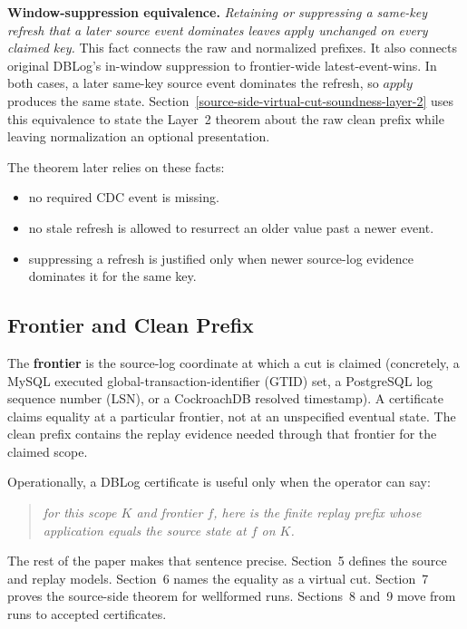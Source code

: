 \documentclass[letterpaper,10pt,twocolumn]{article}
\newcommand{\Apply}{\mathit{apply}}
\providecommand{\tightlist}{\setlength{\itemsep}{0pt}\setlength{\parskip}{0pt}}
\begin{document}
\smallskip
\noindent\textbf{Window-suppression equivalence.} \emph{Retaining or
suppressing a same-key refresh that a later source event dominates
leaves $\Apply$ unchanged on every claimed key.} This fact connects the
raw and normalized prefixes. It also connects original DBLog's
in-window suppression to frontier-wide latest-event-wins. In both
cases, a later same-key source event dominates the refresh, so $\Apply$
produces the same state.
Section~\ref{source-side-virtual-cut-soundness-layer-2} uses this
equivalence to state the Layer~2 theorem about the raw clean prefix
while leaving normalization an optional presentation.

The theorem later relies on these facts:

\begin{itemize}\tightlist
\item no required CDC event is missing.
\item no stale refresh is allowed to resurrect an older value past a
  newer event.
\item suppressing a refresh is justified only when newer source-log
  evidence dominates it for the same key.
\end{itemize}

\subsection{Frontier and Clean Prefix}\label{frontier-and-clean-prefix}

The \textbf{frontier} is the source-log coordinate at which a cut is
claimed (concretely, a MySQL executed global-transaction-identifier
(GTID) set, a PostgreSQL log sequence number (LSN), or a
CockroachDB resolved timestamp). A certificate claims equality at a
particular frontier, not at an unspecified eventual state. The clean prefix contains the
replay evidence needed through that frontier for the claimed scope.

Operationally, a DBLog certificate is useful only when the operator can
say:

\begin{quote}
\itshape
for this scope $K$ and frontier $f$, here is the finite replay prefix
whose application equals the source state at $f$ on $K$.
\end{quote}

The rest of the paper makes that sentence precise. Section~5 defines the
source and replay models. Section~6 names the equality as a virtual cut.
Section~7 proves the source-side theorem for wellformed runs. Sections~8
and~9 move from runs to accepted certificates.
\end{document}
